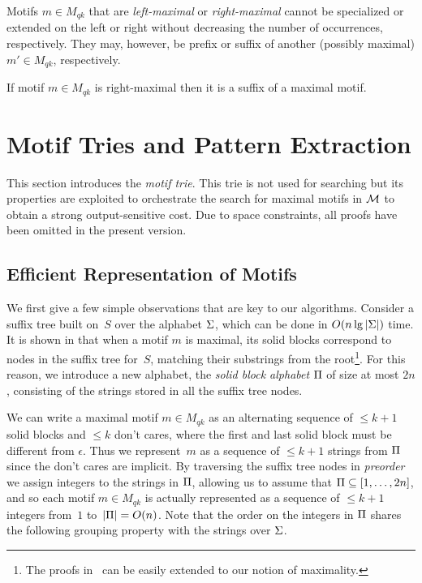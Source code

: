 Motifs $m \in M_{qk}$ that are \emph{left-maximal} or \emph{right-maximal} cannot be specialized or extended on the left or right without decreasing the number of occurrences, respectively. They may, however, be prefix or suffix of another (possibly maximal) $m' \in M_{qk}$, respectively. 

\begin{fact}
  \label{fact:right-maximal-suffix}
  If motif $m \in M_{qk}$ is right-maximal then it is a suffix of a maximal motif.
\end{fact}



\section{Motif Tries and Pattern Extraction}
\label{sec:motif_trie}
%
This section introduces the \emph{motif trie}. This trie is not used for searching but its properties are exploited to orchestrate the search for maximal motifs in $\mathcal{M}$ to obtain a strong output-sensitive cost. Due to space constraints, all proofs have been omitted in the present version.

\subsection{Efficient Representation of Motifs}
\label{sub:efficient-representatin-motifs}
%
We first give a few simple observations that are key to our algorithms. Consider a suffix tree built on~$S$ over the alphabet $\Sigma$, which can be done in $O(n \lg |\Sigma|)$ time. 
It is shown in \cite{tcsUkkonen09,tcsFP09} that when a motif $m$ is maximal, its solid blocks correspond to nodes in the suffix tree for~$S$, matching their substrings from the root\footnote{The proofs in~\cite{tcsUkkonen09,tcsFP09} can be easily extended to our notion of maximality.}.
For this reason, we introduce a new alphabet, the \emph{solid block alphabet} $\Pi$ of size at most $2n$, consisting of the strings stored in all the suffix tree nodes. 

We can write a maximal motif $m \in M_{qk}$ as an alternating sequence of $\leq k+1$ solid blocks and $\leq k$ don't cares, where the first and last solid block must be different from $\epsilon$. Thus we represent~$m$ as a sequence of $\leq k+1$ strings from $\Pi$ since the don't cares are implicit.
By traversing the suffix tree nodes in \emph{preorder} we assign integers to the strings in $\Pi$, allowing us to assume that $\Pi \subseteq [1, \ldots, 2n]$, and so each motif $m \in M_{qk}$ is actually represented as a sequence of $\leq k+1$ integers from~$1$ to~$|\Pi| =O(n)$. Note that the order on the integers in $\Pi$ shares the following grouping property with the strings over $\Sigma$.

